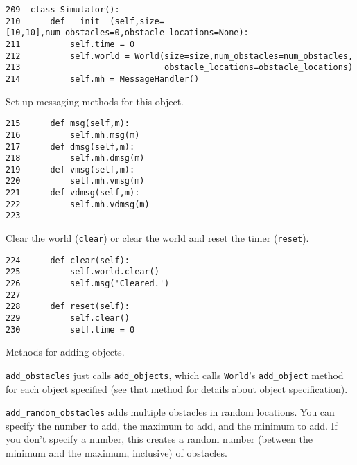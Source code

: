 \documentclass[11pt]{tufte-handout}
\begin{document}
\begin{verbatim}
209  class Simulator():
210      def __init__(self,size=[10,10],num_obstacles=0,obstacle_locations=None):
211          self.time = 0
212          self.world = World(size=size,num_obstacles=num_obstacles,
213                             obstacle_locations=obstacle_locations)
214          self.mh = MessageHandler()
\end{verbatim}

Set up messaging methods for this object.
\begin{verbatim}
215      def msg(self,m):
216          self.mh.msg(m)
217      def dmsg(self,m):
218          self.mh.dmsg(m)
219      def vmsg(self,m):
220          self.mh.vmsg(m)
221      def vdmsg(self,m):
222          self.mh.vdmsg(m)
223  
\end{verbatim}

Clear the world (\texttt{clear}) or clear the world  and reset the timer (\texttt{reset}).

\begin{verbatim}
224      def clear(self):
225          self.world.clear()
226          self.msg('Cleared.')
227  
228      def reset(self):
229          self.clear()
230          self.time = 0
\end{verbatim}

Methods for adding objects.  

\texttt{add\_obstacles} just calls \texttt{add\_objects}, which calls \texttt{World}'s \texttt{add\_object} method for each object specified (see that method for details about object specification).  

\texttt{add\_random\_obstacles} adds multiple obstacles in random locations.  You can specify the number to add, the maximum to add, and the minimum to add.  If you don't specify a number, this creates a random number (between the minimum and the maximum, inclusive) of obstacles.
\end{document}
